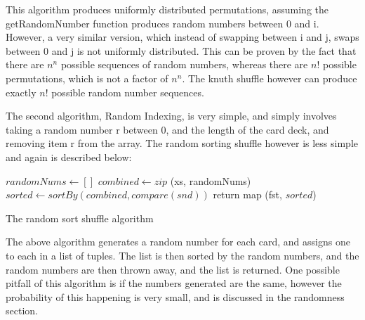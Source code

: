 \vspace{0.3cm}

This algorithm produces uniformly distributed permutations, assuming the
getRandomNumber function produces random numbers between 0 and i. However,
a very similar version, which instead of swapping between i and j, swaps
between 0 and j is not uniformly distributed. This can be proven by
the fact that there are $n^n$ possible sequences of random numbers, whereas
there are ${n!}$ possible permutations, which is not a factor of $n^n$.
The knuth shuffle however can produce exactly ${n!}$ possible random number
sequences. \parencite{website:rici2015}


The second algorithm, Random Indexing, is very simple, and simply involves 
taking a random number r between 0, and the length of the card deck, and 
removing item r from the array. The random sorting shuffle however is less 
simple and again is described below:

\vspace{0.3cm}

\begin{algorithm}[H]
    \BlankLine{}
    $randomNums \leftarrow []$\;
    $combined \leftarrow zip$ (xs, randomNums)\;
    $sorted \leftarrow sortBy ( combined, compare (snd))$\;
    return map (fst, $sorted$)\;
\caption{The random sort shuffle algorithm}
\end{algorithm}

\vspace{0.3cm}

The above algorithm generates a random number for each card, and assigns
one to each in a list of tuples. The list is then sorted by the random numbers,
and the random numbers are then thrown away, and the list is returned. One
possible pitfall of this algorithm is if the numbers generated are the same,
however the probability of this happening is very small, and is discussed
in the randomness section.

